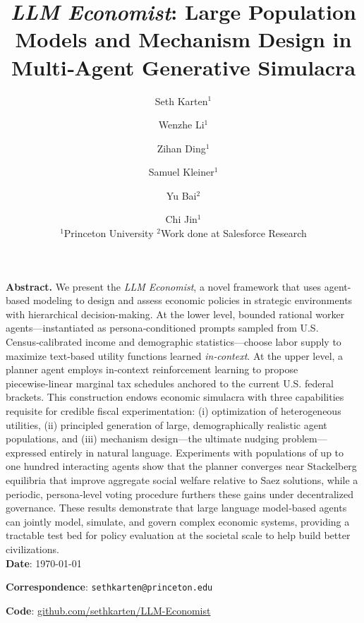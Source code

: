 \documentclass[11pt]{article}
\title{\textit{LLM Economist}: Large Population Models and Mechanism Design in Multi‑Agent Generative Simulacra}
\author{Seth Karten$^{1}$ \and Wenzhe Li$^{1}$ \and Zihan Ding$^{1}$ \and Samuel Kleiner$^{1}$ \and Yu Bai$^{2}$ \and Chi Jin$^{1}$\\[0.2em]
  \small $^{1}$Princeton University \qquad $^{2}$Work done at Salesforce Research}
\date{\vspace{0pt}}
\newcommand{\titleskip}{0.8em}
\begin{document}
\thispagestyle{empty}
\maketitle

\pagestyle{fancy}

\begin{tcolorbox}[
  colback       = LightGrey,
  colframe      = AccentColor!80!black,
  boxrule       = 0pt,
  arc           = 2pt,
  before skip   = 0pt,          %
  after skip    = \titleskip    %
  ]
\noindent\textbf{Abstract.} We present the \textit{LLM Economist}, a novel framework that uses agent-based modeling to design and assess economic policies in strategic environments with hierarchical decision-making. At the lower level, bounded rational worker agents—instantiated as persona‑conditioned prompts sampled from U.S. Census‑calibrated income and demographic statistics—choose labor supply to maximize text‑based utility functions learned \emph{in‑context}. At the upper level, a planner agent employs in‑context reinforcement learning to propose piecewise‑linear marginal tax schedules anchored to the current U.S. federal brackets. This construction endows economic simulacra with three capabilities requisite for credible fiscal experimentation: (i) optimization of heterogeneous utilities, (ii) principled generation of large, demographically realistic agent populations, and (iii) mechanism design---the ultimate nudging problem---expressed entirely in natural language. Experiments with populations of up to one hundred interacting agents show that the planner converges near Stackelberg equilibria that improve aggregate social welfare relative to Saez solutions, while a periodic, persona‑level voting procedure furthers these gains under decentralized governance. These results demonstrate that large language model‑based agents can jointly model, simulate, and govern complex economic systems, providing a tractable test bed for policy evaluation at the societal scale to help build better civilizations.
\\

\textbf{Date}: \today


\textbf{Correspondence}: \texttt{sethkarten@princeton.edu}

\textbf{Code}: \href{https://github.com/sethkarten/LLM-Economist}{github.com/sethkarten/LLM-Economist}
\end{tcolorbox}
\end{document}
